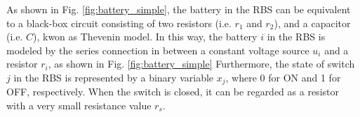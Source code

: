 \documentclass{article}
\begin{document}
As shown in Fig. \ref{fig:battery_simple}, the battery in the RBS can be equivalent to a black-box circuit consisting of two resistors (i.e. $r_1$ and $r_2$), and a capacitor (i.e. $C$), kwon as Thevenin model\cite{hongwenheStateofChargeEstimationLithiumIon2011,mousavig.VariousBatteryModels2014}. %
In this way, the battery $i$ in the RBS is modeled by the series connection in between a constant voltage source $u_{i}$ and a resistor $r_{i}$,  as shown in Fig. \ref{fig:battery_simple}
Furthermore, the state of switch $j$ in the RBS is represented by a binary variable $x_j$, where 0 for ON and 1 for OFF, respectively.
When the switch is closed, it can be regarded as a resistor with a very small resistance value $r_s$.
\end{document}
